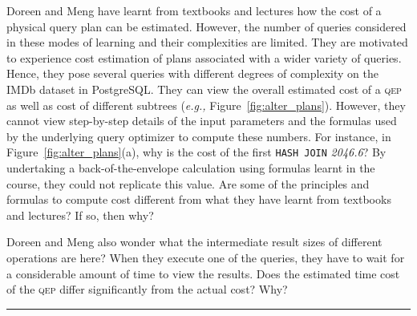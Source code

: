 \documentclass[11pt]{article}
\newcommand{\eg}{\emph{e.g.,}\xspace}
\def\EndOfProof{\nolinebreak\ \hfill\rule{1.5mm}{2.7mm}}
\begin{document}
\begin{example}\label{eg:4}
 Doreen and Meng have learnt from textbooks and lectures how the cost of a physical query plan can be estimated. However, the number of queries considered in these modes of learning and their complexities are limited. They are motivated to experience cost estimation of plans associated with a wider variety of queries. Hence, they pose several queries with different degrees of complexity on the IMDb dataset in PostgreSQL. They can view the overall estimated cost of a \textsc{qep} as well as cost of different subtrees (\eg Figure~\ref{fig:alter_plans}). However, they cannot view step-by-step details of the input parameters and the formulas used by the underlying query optimizer to compute these numbers. For instance, in Figure~\ref{fig:alter_plans}(a), why is the cost of the first \texttt{HASH JOIN} \textit{2046.6}? By undertaking a back-of-the-envelope calculation using formulas learnt in the course, they could not replicate this value. Are some of the principles and formulas to compute cost different from what they have learnt from textbooks and lectures? If so, then why? 
 
 Doreen and Meng also wonder what the intermediate result sizes of different operations are here? When they execute one of the queries, they have to wait for a considerable amount of time to view the results. Does the estimated time cost of the \textsc{qep} differ significantly from the actual cost? Why? 
\EndOfProof
\end{example}
\end{document}
